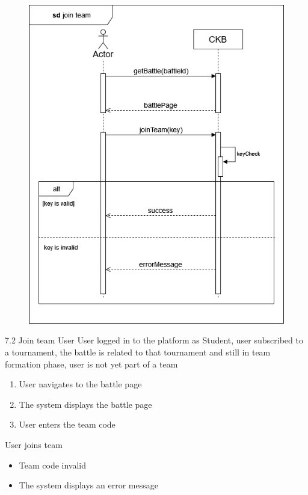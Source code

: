 \usecase
{
    \begin{figure}[H]
        \centering
        \includegraphics[width=\textwidth]{src/sequence_diagrams/jointeam.png}
    \end{figure}
}
{7.2}
{Join team} %
{User} %
{User logged in to the platform as Student, user subscribed to a tournament, the battle is related to that tournament and still in team formation phase, user is not yet part of a team} %
{ %
    \begin{enumerate}
        \item User navigates to the battle page
        \item The system displays the battle page
        \item User enters the team code
    \end{enumerate}
}
{User joins team} %
{ %
    \begin{itemize}
        \item Team code invalid
    \end{itemize}
}
{ %
    \begin{itemize}
        \item The system displays an error message
    \end{itemize}
}

